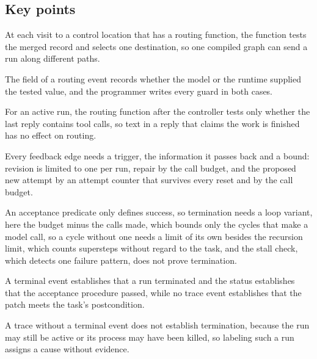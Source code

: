 \subsection*{Key points}
\bi
\item At each visit to a control location that has a routing function, the function tests the merged
record and selects one destination, so one compiled graph can send a run along different paths.
\item The  field of a routing event records whether the model or the runtime supplied the
tested value, and the programmer writes every guard in both cases.
\item For an active run, the routing function after the controller tests only whether the last reply
contains tool calls, so text in a reply that claims the work is finished has no effect on routing.
\item Every feedback edge needs a trigger, the information it passes back and a bound: revision is
limited to one per run, repair by the call budget, and the proposed new attempt by an attempt
counter that survives every reset and by the call budget.
\item An acceptance predicate only defines success, so termination needs a loop variant, here the
budget minus the calls made, which bounds only the cycles that make a model call, so a cycle without
one needs a limit of its own besides the recursion limit, which counts supersteps without regard to
the task, and the stall check, which detects one failure pattern, does not prove termination.
\item A terminal event establishes that a run terminated and the status 
establishes that the acceptance procedure passed, while no trace event establishes that the patch
meets the task's postcondition.
\item A trace without a terminal event does not establish termination, because the run may still be
active or its process may have been killed, so labeling such a run  assigns a cause
without evidence.
\ei
